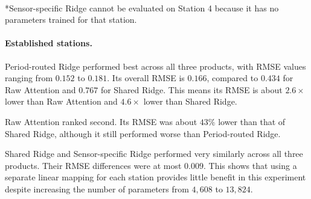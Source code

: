 \documentclass[a4, 12pt]{article}
\begin{document}
\begin{table}[htbp]
\centering
\caption{Observed Performance Ranking (RMSE, m/s$^2$) for Established Stations and Held-out Station 4}
\label{tab:observed_ranking}
\vspace{2mm}
\\[1.5ex]
\raggedright \footnotesize{*Sensor-specific Ridge cannot be evaluated on Station 4 because it has no parameters trained for that station.}
\end{table}

\paragraph{Established stations.}
Period-routed Ridge performed best across all three products, with RMSE values ranging from \(0.152\) to \(0.181\). Its overall RMSE is \(0.166\), compared to \(0.434\) for Raw Attention and \(0.767\) for Shared Ridge. This means its RMSE is about \(2.6\times\) lower than Raw Attention and \(4.6\times\) lower than Shared Ridge.

Raw Attention ranked second. Its RMSE was about \(43\%\) lower than that of Shared Ridge, although it still performed worse than Period-routed Ridge.

Shared Ridge and Sensor-specific Ridge performed very similarly across all three products. Their RMSE differences were at most \(0.009\). This shows that using a separate linear mapping for each station provides little benefit in this experiment despite increasing the number of parameters from \(4{,}608\) to \(13{,}824\).
\end{document}
